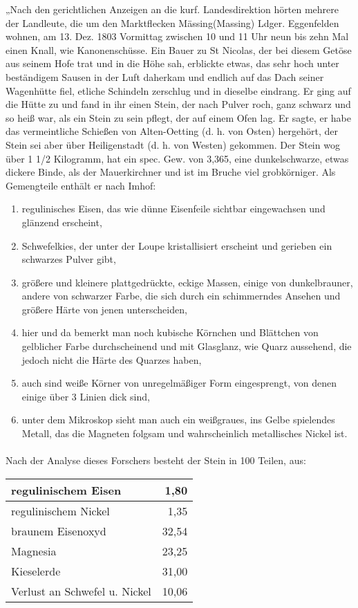 \documentclass[a4paper, 11pt, oneside]{article}
\begin{document}
„Nach den gerichtlichen Anzeigen an die kurf. Landesdirektion hörten mehrere der Landleute, die um den Marktflecken Mässing(Massing) Ldger. Eggenfelden wohnen, am 13. Dez. 1803 Vormittag zwischen 10 und 11 Uhr neun bis zehn Mal einen Knall, wie Kanonenschüsse. Ein Bauer zu St Nicolas, der bei diesem Getöse aus seinem Hofe trat und in die Höhe sah, erblickte etwas, das sehr hoch unter beständigem Sausen in der Luft daherkam und endlich auf das Dach seiner Wagenhütte fiel, etliche Schindeln zerschlug und in dieselbe eindrang. Er ging auf die Hütte zu und fand in ihr einen Stein, der nach Pulver roch, ganz schwarz und so heiß war, als ein Stein zu sein pflegt, der auf einem Ofen lag. Er sagte, er habe das vermeintliche Schießen von Alten-Oetting (d. h. von Osten) hergehört, der Stein sei aber über Heiligenstadt (d. h. von Westen) gekommen. Der Stein wog über 1 1/2 Kilogramm, hat ein spec. Gew. von 3,365, eine dunkelschwarze, etwas dickere Binde, als der Mauerkirchner und ist im Bruche viel grobkörniger. Als Gemengteile enthält er nach Imhof:
\begin{enumerate}
    \item regulinisches Eisen, das wie dünne Eisenfeile sichtbar eingewachsen und glänzend erscheint,
    \item Schwefelkies, der unter der Loupe kristallisiert erscheint und gerieben ein schwarzes Pulver gibt,
    \item größere und kleinere plattgedrückte, eckige Massen, einige von dunkelbrauner, andere von schwarzer Farbe, die sich durch ein schimmerndes Ansehen und größere Härte von jenen unterscheiden,
    \item hier und da bemerkt man noch kubische Körnchen und Blättchen von gelblicher Farbe durchscheinend und mit Glasglanz, wie Quarz aussehend, die jedoch nicht die Härte des Quarzes haben,
    \item auch sind weiße Körner von unregelmäßiger Form eingesprengt, von denen einige über 3 Linien dick sind,
    \item unter dem Mikroskop sieht man auch ein weißgraues, ins Gelbe spielendes Metall, das die Magneten folgsam und wahrscheinlich metallisches Nickel ist.
\end{enumerate}
\paragraph{}
Nach der Analyse dieses Forschers besteht der Stein in 100 Teilen, aus:
\begin{center}
    \begin{tabular}{ |l|r| } 
    \hline
    regulinischem Eisen & 1,80\\\hline
    regulinischem Nickel & 1,35\\\hline
    braunem Eisenoxyd & 32,54\\\hline
    Magnesia & 23,25\\\hline
    Kieselerde & 31,00\\\hline
    Verlust an Schwefel u. Nickel & 10,06\\
    \hline
    \end{tabular}
\end{center}
\end{document}
